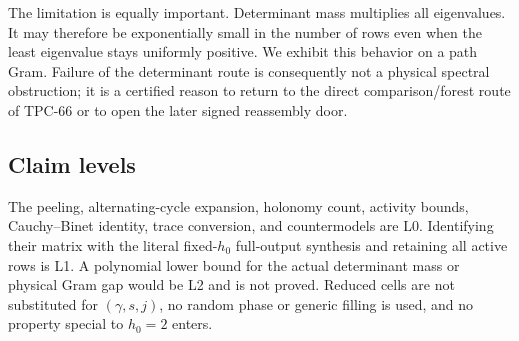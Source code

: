The limitation is equally important. Determinant mass multiplies all
eigenvalues. It may therefore be exponentially small in the number of rows
even when the least eigenvalue stays uniformly positive. We exhibit this
behavior on a path Gram. Failure of the determinant route is consequently not
a physical spectral obstruction; it is a certified reason to return to the
direct comparison/forest route of TPC-66 or to open the later signed
reassembly door.

\subsection*{Claim levels}
The peeling, alternating-cycle expansion, holonomy count, activity bounds,
Cauchy--Binet identity, trace conversion, and countermodels are L0. Identifying
their matrix with the literal fixed-\(h_0\) full-output synthesis and retaining
all active rows is L1. A polynomial lower bound for the actual determinant
mass or physical Gram gap would be L2 and is not proved. Reduced cells are not
substituted for \((\gamma,s,j)\), no random phase or generic filling is used,
and no property special to \(h_0=2\) enters.
